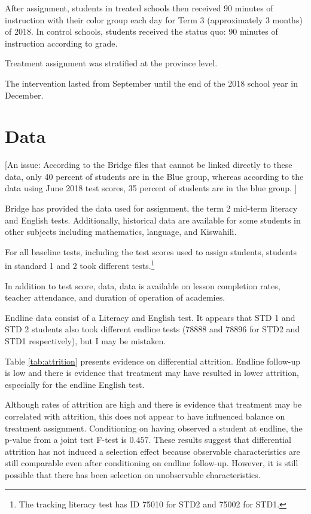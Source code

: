 \documentclass[10pt]{article}
\begin{document}
After assignment, students in treated schools then received 90 minutes of instruction with their color group each day for Term 3 (approximately 3 months) of 2018. In control schools, students received the status quo: 90 minutes of instruction according to grade.

Treatment assignment was stratified at the province level. 



The intervention lasted from September until the end of the 2018 school year in December. 

\section{Data}

[An issue: According to the Bridge files that cannot be linked directly to these data, only 40 percent of students are in the Blue group, whereas according to the data using June 2018 test scores, 35 percent of students are in the blue group. ]

Bridge has provided the data used for assignment, the term 2 mid-term literacy and English tests. Additionally, historical data are available for some students in other subjects including mathematics, language, and Kiswahili. 

For all baseline tests, including the test scores used to assign students, students in standard 1 and 2 took different tests.\footnote{The tracking literacy test has ID 75010 for STD2 and 75002 for STD1.}

In addition to test score, data, data is available on lesson completion rates, teacher attendance, and duration of operation of academies.

Endline data consist of a Literacy and English test. It appears that STD 1 and STD 2 students also took different endline tests (78888 and 78896 for STD2 and STD1 respectively), but I may be mistaken.

Table \ref{tab:attrition} presents evidence on differential attrition. Endline follow-up is low and there is evidence that treatment may have resulted in lower attrition, especially for the endline English test. 



Although rates of attrition are high and there is evidence that treatment may be correlated with attrition, this does not appear to have influenced balance on treatment assignment. Conditioning on having observed a student at endline, the p-value from a joint test F-test is $0.457$. These results suggest that differential attrition has not induced a selection effect because observable characteristics are still comparable even after conditioning on endline follow-up. However, it is still possible that there has been selection on unobservable characteristics. 
\end{document}

